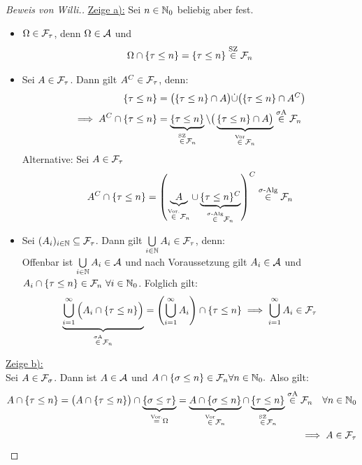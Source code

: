 \documentclass[12pt,a4paper]{article}
\begin{document}
\begin{proof}[Beweis von Willi.]\enter
\underline{Zeige a):} Sei $n\in\mathbb{N}_0$ beliebig aber fest.
\begin{itemize} 
\item $\Omega\in\mathcal{F}_\tau$, denn $\Omega\in\mathcal{A}$ und 
\begin{align*}
\Omega\cap\lbrace\tau\leq n\rbrace=\lbrace\tau\leq n\rbrace \stackrel{\text{SZ}}{\in} \mathcal{F}_n
\end{align*}
\item Sei $A \in \mathcal{F}_\tau$. Dann gilt $A^C \in \mathcal{F}_\tau$, denn:\\
\begin{align*}
\lbrace\tau\leq n\rbrace &=\big(\lbrace\tau\leq n\rbrace\cap A\big)\dot{\cup}\big(\lbrace\tau\leq n\rbrace\cap A^C\big)\\
\implies A^C\cap\lbrace\tau\leq n\rbrace&=\underbrace{\lbrace\tau\leq n\rbrace}_{\stackrel{\text{SZ}}{\in}\mathcal{F}_n}\setminus\big(\underbrace{\lbrace\tau\leq n\rbrace\cap A\big)}_{\stackrel{\text{Vor}}{\in}\mathcal{F}_n}\stackrel{\sigma\text{A}}{\in}\mathcal{F}_n
\end{align*}
Alternative: Sei $A \in \mathcal{F}_\tau$
\begin{align*}
	A^C\cap \lbrace \tau \leq n \rbrace = \left(\underbrace{A}_{\stackrel{\text{Vor.}}{\in} \mathcal{F}_n} \cup \underbrace{\lbrace \tau \leq n \rbrace^C}_{\stackrel{\sigma\text{-Alg}}{\in} \mathcal{F}_n} \right)^C \stackrel{\sigma\text{-Alg}}{\in}\mathcal{F}_n
\end{align*}

\item Sei $(A_i)_{i\in\mathbb{N}}\subseteq\mathcal{F}_\tau$. Dann gilt $\bigcup\limits_{i\in\mathbb{N}} A_i  \in \mathcal{F}_\tau$, denn:\\
Offenbar ist $\bigcup\limits_{i\in\mathbb{N}} A_i  \in\mathcal{A}$ und nach Voraussetzung gilt $A_i\in\mathcal{A}$ und\\ $A_i\cap\lbrace\tau\leq n\rbrace\in\mathcal{F}_n~\forall i\in\mathbb{N}_0$. Folglich gilt:
\begin{align*}
\underbrace{\bigcup\limits_{i=1}^{\infty} \Big (A_i \cap \{\tau \leq n\} \Big )}_{\stackrel{\sigma\text{A}}{\in} \mathcal{F}_n} = \left( \bigcup\limits_{i=1}^{\infty} A_i \right)\cap \{\tau \leq n\} \implies  \bigcup\limits_{i=1}^{\infty} A_i \in \mathcal{F}_\tau
\end{align*}
\end{itemize}

\underline{Zeige b):}\\
Sei $A\in\mathcal{F}_\sigma$. Dann ist $A\in\mathcal{A}$ und $A\cap\lbrace\sigma\leq n\rbrace\in\mathcal{F}_n\forall n\in\mathbb{N}_0.$ Also gilt:
\begin{align*}
A \cap \lbrace\tau \leq n\rbrace
\stackrel{}{=}
\big(A \cap\lbrace\tau \leq n\rbrace\big)\cap\underbrace{\lbrace\sigma\leq\tau\rbrace}_{\stackrel{\text{Vor.}}{=}\Omega}
=\underbrace{A\cap\lbrace\sigma\leq n\rbrace}_{\stackrel{\text{Vor}}{\in}\mathcal{F}_n}\cap\underbrace{\lbrace\tau\leq n\rbrace}_{\stackrel{\text{SZ}}{\in}\mathcal{F}_n} \stackrel{\sigma\text{A}}{\in} \mathcal{F}_n \quad \forall n \in \mathbb{N}_0\\
\implies A\in\mathcal{F}_\tau
\end{align*}


\end{proof}
\end{document}
